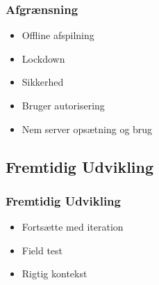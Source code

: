 \begin{frame}
	\frametitle{Afgrænsning}
	\begin{itemize}
		\item Offline afspilning
		\item Lockdown
		\item Sikkerhed
		\item Bruger autorisering
		\item Nem server opsætning og brug
	\end{itemize}
\end{frame}
\subsection{Fremtidig Udvikling}

\begin{frame}
	\frametitle{Fremtidig Udvikling}
	\begin{itemize}
		\item Fortsætte med iteration
		\item Field test
		\item Rigtig kontekst
	\end{itemize}
\end{frame}

{\aauwavesbg
\begin{frame}
	\titlepage
\end{frame}}
